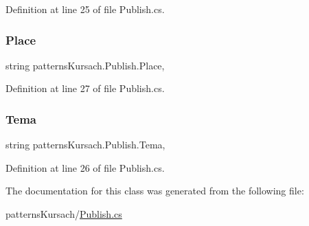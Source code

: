Definition at line 25 of file Publish.\+cs.

\mbox{\label{classpatterns_kursach_1_1_publish_ac20d4f17cd986d842eb5840f121fcec6}} 
\subsubsection{\texorpdfstring{Place}{Place}}
{\footnotesize\ttfamily string patterns\+Kursach.\+Publish.\+Place\hspace{0.3cm}{\ttfamily [get]}, {\ttfamily [set]}}



Definition at line 27 of file Publish.\+cs.

\mbox{\label{classpatterns_kursach_1_1_publish_a0e90f8e6a65fb7af38629af11f9df0fc}} 
\subsubsection{\texorpdfstring{Tema}{Tema}}
{\footnotesize\ttfamily string patterns\+Kursach.\+Publish.\+Tema\hspace{0.3cm}{\ttfamily [get]}, {\ttfamily [set]}}



Definition at line 26 of file Publish.\+cs.



The documentation for this class was generated from the following file\+:\begin{DoxyCompactItemize}
\item 
patterns\+Kursach/\mbox{\hyperlink{_publish_8cs}{Publish.\+cs}}\end{DoxyCompactItemize}
